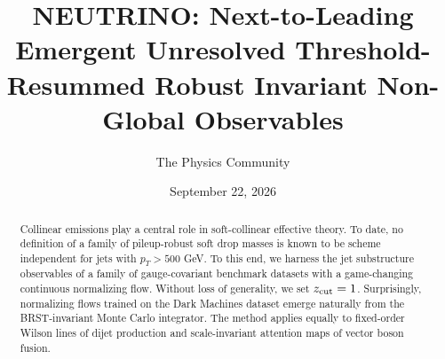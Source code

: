 \documentclass[11pt]{article}
\title{NEUTRINO: Next-to-Leading Emergent Unresolved Threshold-Resummed Robust Invariant Non-Global Observables}
\author{The Physics Community}
\date{September 22, 2026}
\numberwithin{equation}{section}
\theoremstyle{definition}
\theoremstyle{remark}
\begin{document}
\maketitle
\begin{abstract}
Collinear emissions play a central role in soft-collinear effective
theory. To date, no definition of a family of pileup-robust soft drop
masses is known to be scheme independent for jets with $p_T > 500$ GeV.
To this end, we harness the jet substructure observables of a family of
gauge-covariant benchmark datasets with a game-changing continuous
normalizing flow. Without loss of generality, we set $z_{\rm cut} = 1$.
Surprisingly, normalizing flows trained on the Dark Machines dataset
emerge naturally from the BRST-invariant Monte Carlo integrator. The
method applies equally to fixed-order Wilson lines of dijet production
and scale-invariant attention maps of vector boson fusion.
\end{abstract}
\tableofcontents



\nocite{*}


\end{document}
